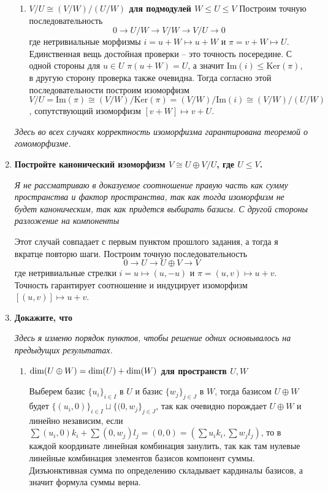 \documentclass{article}
\begin{document}
\begin{enumerate}
\begin{enumerate}
            \item \textbf{$V/U\cong(V/W)/(U/W)$ для подмодулей $W\leq U\leq V$}
                Построим точную последовательность
                \[0\rightarrow U/W\rightarrow V/W\rightarrow V/U\rightarrow 0\]
                где нетривиальные морфизмы $i=u+W\mapsto u+W$ и $\pi=v+W\mapsto U$. Единственная вещь достойная проверки
                – это точность посередине. С одной стороны для $u\in U$ $\pi(u+W)=U$, а значит $\text{Im}(i)\leq
                \text{Ker}(\pi)$, в другую сторону проверка также очевидна. Тогда согласно этой последовательности
                построим изоморфизм $V/U=\text{Im}(\pi)\cong (V/W)/\text{Ker}(\pi)=(V/W)/\text{Im}(i)\cong(V/W)/(U/W)$,
                сопутствующий изоморфизм $[v+W]\mapsto v+U$.
        \end{enumerate}
        \textit{Здесь во всех случаях корректность изоморфизма гарантирована теоремой о гомоморфизме.}

    \item \textbf{Постройте канонический изоморфизм $V\cong U\oplus V/U$, где $U\leq V$.}
        
        \textit{Я не рассматриваю в доказуемое соотношение правую часть как сумму пространства и фактор пространства,
        так как тогда изоморфизм не будет каноническим, так как придется выбирать базисы. С другой стороны разложение
        на компоненты}

        Этот случай совпадает с первым пунктом прошлого задания, а тогда я вкратце повторю шаги. Построим точную
        последовательность
        \[0\rightarrow U\rightarrow U\oplus V\rightarrow V\]
        где нетривиальные стрелки $i=u\mapsto (u,-u)$ и $\pi=(u,v)\mapsto u+v$. Точность гарантирует соотношение
        и индуцирует изоморфизм $[(u,v)]\mapsto u+v$.

    \item \textbf{Докажите, что}
        
        \textit{Здесь я изменю порядок пунктов, чтобы решение одних основывалось на предыдущих результатах.}
        \begin{enumerate}
            \item \textbf{$\textnormal{dim}(U\oplus W)=\textnormal{dim}(U)+\textnormal{dim}(W)$ для пространств $U,W$}

                Выберем базис $\{u_i\}_{i\in I}$ в $U$ и базис $\{w_j\}_{j\in J}$ в $W$, тогда базисом $U\oplus W$
                будет $\{(u_i,0)\}_{i\in I}\sqcup\{(0,w_j\}_{j\in J}$, так как очевидно порождает $U\oplus W$ и
                линейно независим, если $\sum(u_i, 0)k_i + \sum(0, w_j)l_j = (0,0)=(\sum u_ik_i, \sum w_jl_j)$, то
                в каждой координате линейная комбинация занулить, так как там нулевые линейные комбинация элементов
                базисов компонент суммы. Дизъюнктивная сумма по определению складывает кардиналы базисов, а значит
                формула суммы верна.


\end{enumerate}
\end{enumerate}
\end{document}
